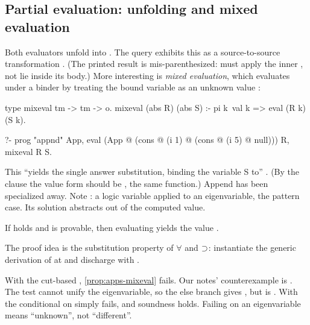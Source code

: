 {{\subsection{Partial evaluation: unfolding and mixed evaluation}\label{sec:apps-mixeval}

Both evaluators unfold  into . The query
 exhibits this as a source-to-source
transformation . (The printed result is mis-parenthesized:  must apply the
inner , not lie inside its body.) More interesting is \emph{mixed evaluation}, which evaluates
under a binder by treating the bound variable as an unknown value :

\begin{lprolog}
type mixeval  tm -> tm -> o.
mixeval (abs R) (abs S) :- pi k\ val k => eval (R k) (S k).

?- prog "appnd" App,
   eval (App @ (cons @ (i 1) @ (cons @ (i 5) @ null))) R,
   mixeval R S.
\end{lprolog}

\noindent This ``yields the single answer substitution, binding the variable S to''
 . (By the  clause the value form
should be , the same function.) Append has been specialized away. Note
: a logic variable applied to an eigenvariable, the pattern case. Its solution abstracts 
out of the computed value.

\begin{proposition}[\book{256}]\label{prop:apps-mixeval}
If  holds and  is provable, then evaluating  yields the value
.
\end{proposition}

\noindent The proof idea is the substitution property of $\forall$ and $\supset$: instantiate the generic
derivation of  at  and discharge  with .

\begin{pitfall}
With the cut-based , \cref{prop:apps-mixeval} fails. Our notes' counterexample is
. The test  cannot unify the
eigenvariable, so the else branch gives , but  is .
With  the conditional on  simply fails, and soundness holds. Failing
on an eigenvariable means ``unknown'', not ``different''.
\end{pitfall}

}}
